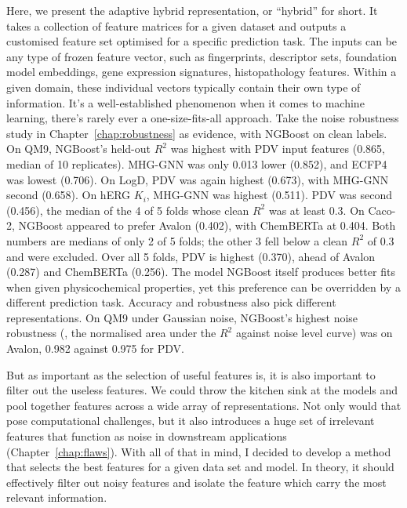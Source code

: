 Here, we present the adaptive hybrid representation, or ``hybrid'' for short. It takes a collection of feature matrices for a given dataset and outputs a customised feature set optimised for a specific prediction task. The inputs can be any type of frozen feature vector, such as fingerprints, descriptor sets, foundation model embeddings, gene expression signatures, histopathology features. Within a given domain, these individual vectors typically contain their own type of information. It's a well-established phenomenon when it comes to machine learning, there's rarely ever a one-size-fits-all approach. Take the noise robustness study in Chapter~\ref{chap:robustness} as evidence, with NGBoost on clean labels. On QM9, NGBoost's held-out $R^2$ was highest with PDV input features (0.865, median of 10 replicates). MHG-GNN was only 0.013 lower (0.852), and ECFP4 was lowest (0.706). On LogD, PDV was again highest (0.673), with MHG-GNN second (0.658). On hERG $K_i$, MHG-GNN was highest (0.511). PDV was second (0.456), the median of the 4 of 5 folds whose clean $R^2$ was at least 0.3. On Caco-2, NGBoost appeared to prefer Avalon (0.402), with ChemBERTa at 0.404. Both numbers are medians of only 2 of 5 folds; the other 3 fell below a clean $R^2$ of 0.3 and were excluded. Over all 5 folds, PDV is highest (0.370), ahead of Avalon (0.287) and ChemBERTa (0.256). The model NGBoost itself produces better fits when given physicochemical properties, yet this preference can be overridden by a different prediction task. Accuracy and robustness also pick different representations. On QM9 under Gaussian noise, NGBoost's highest noise robustness (\aucnorm, the normalised area under the $R^2$ against noise level curve) was on Avalon, 0.982 against 0.975 for PDV.

But as important as the selection of useful features is, it is also important to filter out the useless features. We could throw the kitchen sink at the models and pool together features across a wide array of representations. Not only would that pose computational challenges, but it also introduces a huge set of irrelevant features that function as noise in downstream applications (Chapter~\ref{chap:flaws}). With all of that in mind, I decided to develop a method that selects the best features for a given data set and model. In theory, it should effectively filter out noisy features and isolate the feature which carry the most relevant information.

